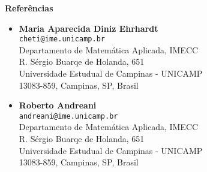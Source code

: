 \documentclass[a4paper,11pt]{article}
\begin{document}
\begin{center}
  \Large \bf Referências
\end{center}

\vspace{1cm}
\begin{itemize}
  \item {\bf Maria Aparecida Diniz Ehrhardt} \\
    \verb+cheti@ime.unicamp.br+ \\
    Departamento de Matemática Aplicada, IMECC  \\
    R. Sérgio Buarqe de Holanda, 651 \\
    Universidade Estudual de Campinas - UNICAMP \\
    13083-859, Campinas, SP, Brasil
  \vspace{0.5cm}
\item {\bf Roberto Andreani} \\
    \verb+andreani@ime.unicamp.br+ \\
    Departamento de Matemática Aplicada, IMECC  \\
    R. Sérgio Buarqe de Holanda, 651 \\
    Universidade Estudual de Campinas - UNICAMP \\
    13083-859, Campinas, SP, Brasil
\end{itemize}
\end{document}
